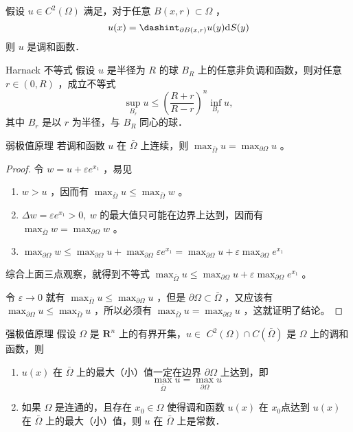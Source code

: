 \documentclass{mynote}
\begin{document}
\begin{theorem}\label{harmonic_function_theorem}
    假设 $u \in C^2(\Omega)$ 满足，对于任意 $B(x, r) \subset \Omega$ ，
$$
u(x)=\dashint_{\partial B(x, r)} u(y) \mathrm{d} S(y)
$$
则 $u$ 是调和函数．
\end{theorem}

\begin{theorem}{Harnack 不等式}\label{Harnack_inequality}
    假设 $u$ 是半径为 $R$ 的球 $B_R$ 上的任意非负调和函数，则对任意 $r \in(0, R)$ ，成立不等式
$$
\sup _{B_r} u \leq\left(\frac{R+r}{R-r}\right)^n \inf _{B_r} u,
$$
其中 $B_r$ 是以 $r$ 为半径，与 $B_R$ 同心的球．
\end{theorem}

\begin{theorem}{弱极值原理}\label{weak_maximum_principle}
    若调和函数 $u$ 在 $\bar{\Omega}$ 上连续，则 $\max _{\bar{\Omega}} u=\max _{\partial \Omega} u$ 。
\end{theorem}
\begin{proof}
    令 $w=u+\varepsilon e^{x_1}$ ，易见
    \begin{enumerate}
        \item $w>u$ ，因而有 $\max _{\bar{\Omega}} u \leq \max _{\bar{\Omega}} w$ 。
        \item $\Delta w=\varepsilon e^{x_1}>0, ~ w$ 的最大值只可能在边界上达到，因而有 $\max _{\bar{\Omega}} w=\max _{\partial \Omega} w$ 。
        \item $\max _{\partial \Omega} w \leq \max _{\partial \Omega} u+\max _{\partial \Omega} \varepsilon e^{x_1}=\max _{\partial \Omega} u+\varepsilon \max _{\partial \Omega} e^{x_1}$
    \end{enumerate}
    综合上面三点观察，就得到不等式 $\max _{\bar{\Omega}} u \leq \max _{\partial \Omega} u+\varepsilon \max _{\partial \Omega} e^{x_1}$ 。

    令 $\varepsilon \rightarrow 0$ 就有 $\max _{\bar{\Omega}} u \leq \max _{\partial \Omega} u$ ，但是 $\partial \Omega \subset \bar{\Omega}$ ，又应该有 $\max _{\partial \Omega} u \leq \max _{\bar{\Omega}} u$ ，所以必须有 $\max _{\bar{\Omega}} u=\max _{\partial \Omega} u$ ，这就证明了结论。
\end{proof}
\begin{theorem}{强极值原理}\label{strong_maximum_principle}
    假设 $\Omega$ 是 $\mathbf{R}^n$ 上的有界开集，$u \in$ $C^2(\Omega) \cap C(\bar{\Omega})$ 是 $\Omega$ 上的调和函数，则
    \begin{enumerate}
        \item\label{strong_maximum_principle_1} $u(x)$ 在 $\bar{\Omega}$ 上的最大（小）值一定在边界 $\partial \Omega$ 上达到，即
            $$
            \max _{\bar{\Omega}} u=\max _{\partial \Omega} u
            $$
        \item\label{strong_maximum_principle_2} 如果 $\Omega$ 是连通的，且存在 $x_0 \in \Omega$ 使得调和函数 $u(x)$ 在 $x_0$点达到 $u(x)$ 在 $\bar{\Omega}$ 上的最大（小）值，则 $u$ 在 $\bar{\Omega}$ 上是常数．
    \end{enumerate}
\end{theorem}
\end{document}

